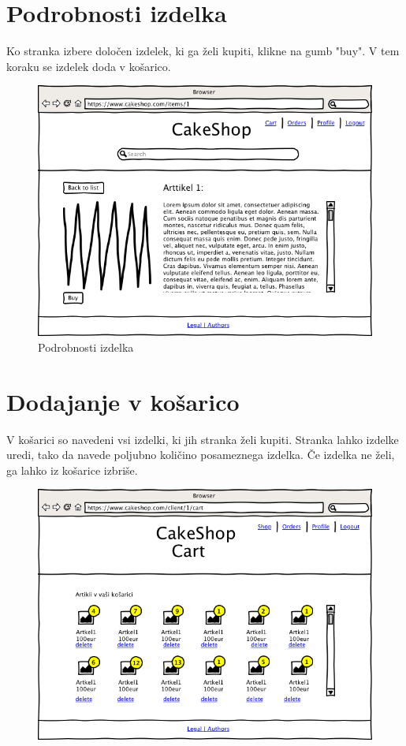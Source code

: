 \documentclass[a4paper,12pt]{report}
\begin{document}
\section{Podrobnosti izdelka}

Ko stranka izbere določen izdelek, ki ga želi kupiti, klikne na gumb "buy". V tem koraku se izdelek doda v košarico.

\begin{figure}[htb]
	\centering
	\includegraphics[width=13cm]{Wireframes/cakeshop/pngs/020100-ItemsDetailsClient.png}
	\caption{Podrobnosti izdelka}
\label{fig:3}
\end{figure}

\section{Dodajanje v košarico}

V košarici so navedeni vsi izdelki, ki jih stranka želi kupiti. Stranka lahko izdelke uredi, tako da navede poljubno količino posameznega izdelka. Če izdelka ne želi, ga lahko iz košarice izbriše.

\begin{figure}[htb]
	\centering
	\includegraphics[width=13cm]{Wireframes/cakeshop/pngs/020200-CartViewClient.png}
	\caption{}
\label{fig:4}
\end{figure}
\end{document}
